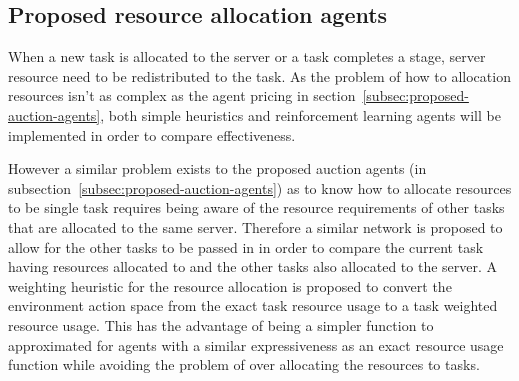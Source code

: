 
\subsection{Proposed resource allocation agents}\label{subsec:proposed-resource-allocation-agents}
When a new task is allocated to the server or a task completes a stage, server resource need to be redistributed
to the task. As the problem of how to allocation resources isn't as complex as the agent pricing in
section~\ref{subsec:proposed-auction-agents}, both simple heuristics and reinforcement learning agents will be
implemented in order to compare effectiveness.

However a similar problem exists to the proposed auction agents (in subsection~\ref{subsec:proposed-auction-agents}) as
to know how to allocate resources to be single task requires being aware of the resource requirements of other tasks
that are allocated to the same server. Therefore a similar network is proposed to allow for the other tasks to be
passed in in order to compare the current task having resources allocated to and the other tasks also allocated to the
server. A weighting heuristic for the resource allocation is proposed to convert the environment action space from the
exact task resource usage to a task weighted resource usage. This has the advantage of being a simpler function to
approximated for agents with a similar expressiveness as an exact resource usage function while avoiding the problem of
over allocating the resources to tasks.

